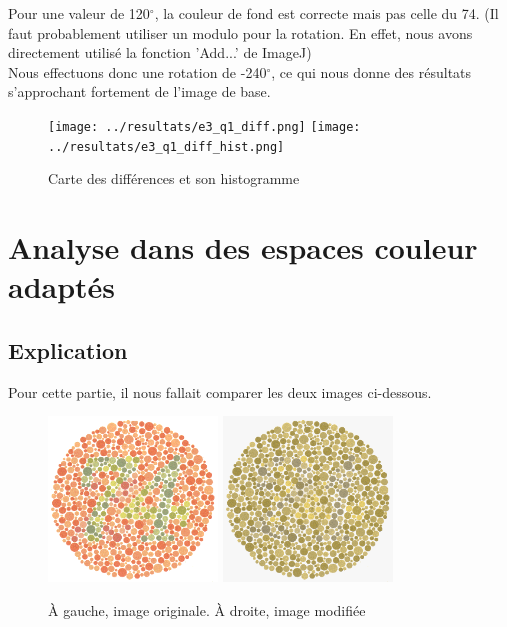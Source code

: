 \documentclass[a4paper]{article}
\begin{document}
Pour une valeur de 120${^\circ}$, la couleur de fond est correcte mais pas celle du 74. (Il faut probablement utiliser un modulo pour la rotation. En effet, nous avons directement utilisé la fonction 'Add...' de ImageJ)\\

Nous effectuons donc une rotation de -240${^\circ}$, ce qui nous donne des résultats s'approchant fortement de l'image de base.

\begin{figure}[H]
\begin{center}
\texttt{[image: ../resultats/e3\_q1\_diff.png]}
\texttt{[image: ../resultats/e3\_q1\_diff\_hist.png]}
\end{center}
\caption{Carte des différences et son histogramme}
\end{figure}

\clearpage


\section{Analyse dans des espaces couleur adaptés}

\subsection{Explication}

Pour cette partie, il nous fallait comparer les deux images ci-dessous.

\begin{figure}[H]
\begin{center}
\includegraphics[width=170px]{../base/cas_3_dalton74.png}
\includegraphics[width=170px]{../base/cas3_dalton74_question4_1.png}
\end{center}
\caption{À gauche, image originale. À droite, image modifiée}
\end{figure}
\end{document}
